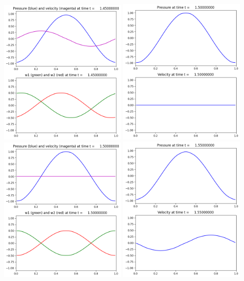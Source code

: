 \documentclass[11pt]{article}
\begin{document}
\includegraphics[width=0.475\textwidth]{frame0029fig2.png}
\vskip 10pt 
\includegraphics[width=0.475\textwidth]{frame0030fig1.png}
\includegraphics[width=0.475\textwidth]{frame0030fig2.png}
\vskip 10pt 
\includegraphics[width=0.475\textwidth]{frame0031fig1.png}
\end{document}
